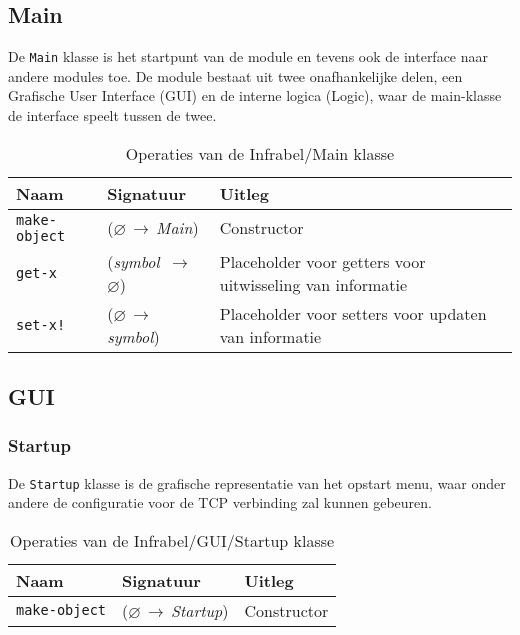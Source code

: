 \documentclass[a4paper, 11pt]{article}
\newcommand{\naar}{\,$\rightarrow$\,}
\renewcommand{\empty}{$\varnothing$}
\newcommand{\<}{\scriptsize\textless\normalsize}
\renewcommand{\>}{\scriptsize\textgreater\normalsize}
\begin{document}
\subsection{Main} %
De \texttt{Main} klasse is het startpunt van de module en tevens ook de interface naar andere modules toe. De module bestaat uit twee onafhankelijke delen, een Grafische User Interface (GUI) en de interne logica (Logic), waar de main-klasse de interface speelt tussen de twee.
\begin{table}[H]
	\begin{center}
		{
		\begin{tabular}{|l l l|}
			\hline
			\textbf{Naam} & \textbf{Signatuur} & \textbf{Uitleg}\\
			\hline
			\texttt{make-object} & (\empty \naar \textit{Main}) & Constructor\\
			\hline
			\texttt{get-x} & (\textit{symbol} \naar \empty) & Placeholder voor getters voor uitwisseling van informatie\\
			\texttt{set-x!} & (\empty \naar \textit{symbol}) & Placeholder voor setters voor updaten van informatie\\
			\hline
		\end{tabular}}
		\caption{Operaties van de Infrabel/Main klasse}
	\end{center}
\end{table}

\subsection{GUI} %

\subsubsection{Startup} %
De \texttt{Startup} klasse is de grafische representatie van het opstart menu, waar onder andere de configuratie voor de TCP verbinding zal kunnen gebeuren.
\begin{table}[H]
	\begin{center}
		{
		\begin{tabular}{|l l l|}
			\hline
			\textbf{Naam} & \textbf{Signatuur} & \textbf{Uitleg}\\
			\hline
			\texttt{make-object} & (\empty \naar \textit{Startup}) & Constructor\\
			\hline
		\end{tabular}}
		\caption{Operaties van de Infrabel/GUI/Startup klasse}
	\end{center}
\end{table}
\end{document}

